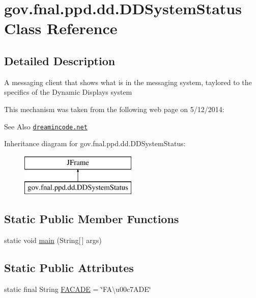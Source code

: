 \hypertarget{classgov_1_1fnal_1_1ppd_1_1dd_1_1DDSystemStatus}{\section{gov.\-fnal.\-ppd.\-dd.\-D\-D\-System\-Status Class Reference}
\label{classgov_1_1fnal_1_1ppd_1_1dd_1_1DDSystemStatus}
}


\subsection{Detailed Description}
A messaging client that shows what is in the messaging system, taylored to the specifics of the Dynamic Displays system 

This mechanism was taken from the following web page on 5/12/2014\-: \begin{DoxySeeAlso}{See Also}
\href{http://www.dreamincode.net/forums/topic/259777-a-simple-chat-program-with-clientserver-gui-optional/}{\tt dreamincode.\-net} 
\end{DoxySeeAlso}
Inheritance diagram for gov.\-fnal.\-ppd.\-dd.\-D\-D\-System\-Status\-:\begin{figure}[H]
\begin{center}
\leavevmode
\includegraphics[height=2.000000cm]{classgov_1_1fnal_1_1ppd_1_1dd_1_1DDSystemStatus}
\end{center}
\end{figure}
\subsection*{Static Public Member Functions}
\begin{DoxyCompactItemize}
\item 
static void \hyperlink{classgov_1_1fnal_1_1ppd_1_1dd_1_1DDSystemStatus_ad4390f954cf4786ace5e28e4d2235045}{main} (String\mbox{[}$\,$\mbox{]} args)
\end{DoxyCompactItemize}
\subsection*{Static Public Attributes}
\begin{DoxyCompactItemize}
\item 
static final String \hyperlink{classgov_1_1fnal_1_1ppd_1_1dd_1_1DDSystemStatus_aa60dbf33b6f3e62aa0f0a8b1cf5787d5}{F\-A\-C\-A\-D\-E} = \char`\"{}F\-A\textbackslash{}u00c7\-A\-D\-E\char`\"{}
\end{DoxyCompactItemize}



